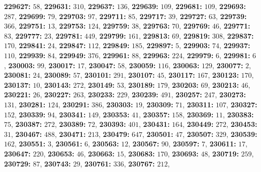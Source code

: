 \textsf{\bfseries 229627:} $58$, \textsf{\bfseries 229631:} $310$, \textsf{\bfseries 229637:} $136$, \textsf{\bfseries 229639:} $109$, \textsf{\bfseries 229681:} $109$, \textsf{\bfseries 229693:} $287$, \textsf{\bfseries 229699:} $79$, \textsf{\bfseries 229703:} $97$, \textsf{\bfseries 229711:} $85$, \textsf{\bfseries 229717:} $39$, \textsf{\bfseries 229727:} $63$, \textsf{\bfseries 229739:} $366$, \textsf{\bfseries 229751:} $13$, \textsf{\bfseries 229753:} $124$, \textsf{\bfseries 229759:} $38$, \textsf{\bfseries 229763:} $70$, \textsf{\bfseries 229769:} $46$, \textsf{\bfseries 229771:} $83$, \textsf{\bfseries 229777:} $23$, \textsf{\bfseries 229781:} $449$, \textsf{\bfseries 229799:} $161$, \textsf{\bfseries 229813:} $69$, \textsf{\bfseries 229819:} $308$, \textsf{\bfseries 229837:} $170$, \textsf{\bfseries 229841:} $24$, \textsf{\bfseries 229847:} $112$, \textsf{\bfseries 229849:} $185$, \textsf{\bfseries 229897:} $5$, \textsf{\bfseries 229903:} $74$, \textsf{\bfseries 229937:} $110$, \textsf{\bfseries 229939:} $84$, \textsf{\bfseries 229949:} $376$, \textsf{\bfseries 229961:} $88$, \textsf{\bfseries 229963:} $224$, \textsf{\bfseries 229979:} $6$, \textsf{\bfseries 229981:} $6$, \textsf{\bfseries 230003:} $99$, \textsf{\bfseries 230017:} $17$, \textsf{\bfseries 230047:} $58$, \textsf{\bfseries 230059:} $116$, \textsf{\bfseries 230063:} $129$, \textsf{\bfseries 230077:} $2$, \textsf{\bfseries 230081:} $24$, \textsf{\bfseries 230089:} $57$, \textsf{\bfseries 230101:} $291$, \textsf{\bfseries 230107:} $45$, \textsf{\bfseries 230117:} $167$, \textsf{\bfseries 230123:} $170$, \textsf{\bfseries 230137:} $10$, \textsf{\bfseries 230143:} $272$, \textsf{\bfseries 230149:} $53$, \textsf{\bfseries 230189:} $179$, \textsf{\bfseries 230203:} $69$, \textsf{\bfseries 230213:} $46$, \textsf{\bfseries 230221:} $26$, \textsf{\bfseries 230227:} $263$, \textsf{\bfseries 230233:} $229$, \textsf{\bfseries 230239:} $491$, \textsf{\bfseries 230257:} $247$, \textsf{\bfseries 230273:} $131$, \textsf{\bfseries 230281:} $124$, \textsf{\bfseries 230291:} $386$, \textsf{\bfseries 230303:} $19$, \textsf{\bfseries 230309:} $71$, \textsf{\bfseries 230311:} $107$, \textsf{\bfseries 230327:} $152$, \textsf{\bfseries 230339:} $94$, \textsf{\bfseries 230341:} $149$, \textsf{\bfseries 230353:} $41$, \textsf{\bfseries 230357:} $158$, \textsf{\bfseries 230369:} $11$, \textsf{\bfseries 230383:} $75$, \textsf{\bfseries 230387:} $272$, \textsf{\bfseries 230389:} $72$, \textsf{\bfseries 230393:} $401$, \textsf{\bfseries 230431:} $164$, \textsf{\bfseries 230449:} $272$, \textsf{\bfseries 230453:} $31$, \textsf{\bfseries 230467:} $488$, \textsf{\bfseries 230471:} $213$, \textsf{\bfseries 230479:} $647$, \textsf{\bfseries 230501:} $47$, \textsf{\bfseries 230507:} $329$, \textsf{\bfseries 230539:} $162$, \textsf{\bfseries 230551:} $3$, \textsf{\bfseries 230561:} $6$, \textsf{\bfseries 230563:} $12$, \textsf{\bfseries 230567:} $90$, \textsf{\bfseries 230597:} $7$, \textsf{\bfseries 230611:} $17$, \textsf{\bfseries 230647:} $220$, \textsf{\bfseries 230653:} $46$, \textsf{\bfseries 230663:} $15$, \textsf{\bfseries 230683:} $170$, \textsf{\bfseries 230693:} $48$, \textsf{\bfseries 230719:} $259$, \textsf{\bfseries 230729:} $87$, \textsf{\bfseries 230743:} $29$, \textsf{\bfseries 230761:} $336$, \textsf{\bfseries 230767:} $212$, 

